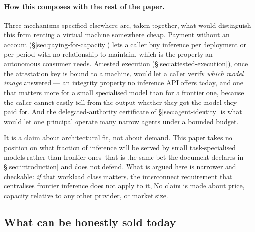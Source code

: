 \paragraph{How this composes with the rest of the paper.}
Three mechanisms specified elsewhere are, taken together, what would distinguish this from renting a
virtual machine somewhere cheap. Payment without an account (\S\ref{sec:paying-for-capacity}) lets a
caller buy inference per deployment or per period with no relationship to maintain, which is the
property an autonomous consumer needs. Attested execution (\S\ref{sec:attested-execution}), once the
attestation key is bound to a machine, would let a caller verify \emph{which model image} answered ---
an integrity property no inference API offers today, and one that matters more for a small specialised
model than for a frontier one, because the caller cannot easily tell from the output whether they got
the model they paid for. And the delegated-authority certificate of \S\ref{sec:agent-identity} is what
would let one principal operate many narrow agents under a bounded budget.

\begin{remark}
\label{rem:ac-scope}
It is a claim about architectural fit, not about demand. This paper takes no position on what fraction
of inference will be served by small task-specialised models rather than frontier ones; that is the same
bet the document declares in \S\ref{sec:introduction} and does not defend. What is argued here is
narrower and checkable: \emph{if} that workload class matters, the interconnect requirement that
centralises frontier inference does not apply to it,  No claim is made about
price, capacity relative to any other provider, or market size.
\end{remark}

\subsection{What can be honestly sold today}
\label{sec:accelerated-compute-summary}

